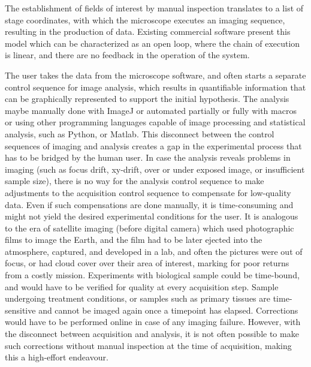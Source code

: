 The establishment of fields of interest by manual inspection translates to a list of stage coordinates, with which the microscope executes an imaging sequence, resulting in the production of data. Existing commercial software present this model which can be characterized as an open loop, where the chain of execution is linear, and there are no feedback in the operation of the system.

The user takes the data from the microscope software, and often starts a separate control sequence for image analysis, which results in quantifiable information that can be graphically represented to support the initial hypothesis. The analysis maybe manually done with ImageJ or automated partially or fully with macros or using other programming languages capable of image processing and statistical analysis, such as Python, or Matlab. This disconnect between the control sequences of imaging and analysis creates a gap in the experimental process that has to be bridged by the human user. In case the analysis reveals problems in imaging (such as focus drift, xy-drift, over or under exposed image, or insufficient sample size), there is no way for the analysis control sequence to make adjustments to the acquisition control sequence to compensate for low-quality data. Even if such compensations are done manually, it is time-consuming and might not yield the desired experimental conditions for the user. It is analogous to the era of satellite imaging (before digital camera) which used photographic films to image the Earth, and the film had to be later ejected into the atmosphere, captured, and developed in a lab, and often the pictures were out of focus, or had cloud cover over their area of interest, marking for poor returns from a costly mission. Experiments with biological sample could be time-bound, and would have to be verified for quality at every acquisition step. Sample undergoing treatment conditions, or samples such as primary tissues are time-sensitive and cannot be imaged again once a timepoint has elapsed. Corrections would have to be performed online in case of any imaging failure. However, with the disconnect between acquisition and analysis, it is not often possible to make such corrections without manual inspection at the time of acquisition, making this a high-effort endeavour.


